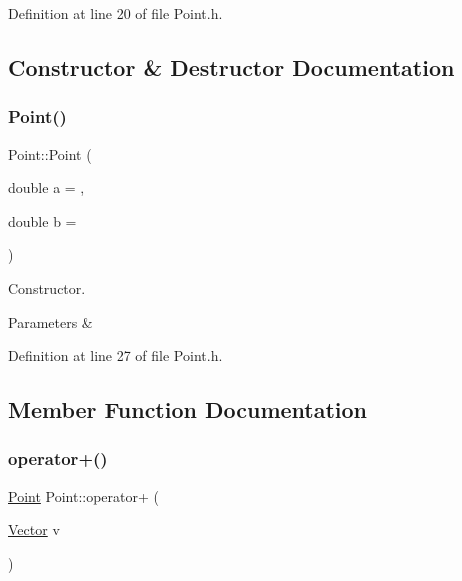 Definition at line 20 of file Point.\+h.



\subsection{Constructor \& Destructor Documentation}
\mbox{\label{struct_point_ad426ece2a678805f7f2b9e6e0bfa33d3}} 
\subsubsection{\texorpdfstring{Point()}{Point()}}
{\footnotesize\ttfamily Point\+::\+Point (\begin{DoxyParamCaption}\item[{double}]{a = {},  }\item[{double}]{b = {} }\end{DoxyParamCaption})\hspace{0.3cm}{\ttfamily [inline]}}



Constructor. 


\begin{DoxyParams}{Parameters}
{\em } & \\
\hline
\end{DoxyParams}


Definition at line 27 of file Point.\+h.


\begin{DoxyCode}{0}

\end{DoxyCode}


\subsection{Member Function Documentation}
\mbox{\label{struct_point_a863eb9e840f8a70ab262f57dd5012f9e}} 
\subsubsection{\texorpdfstring{operator+()}{operator+()}}
{\footnotesize\ttfamily \mbox{\hyperlink{struct_point}{Point}} Point\+::operator+ (\begin{DoxyParamCaption}\item[{\mbox{\hyperlink{struct_vector}{Vector}}}]{v }\end{DoxyParamCaption})\hspace{0.3cm}{\ttfamily [inline]}}



